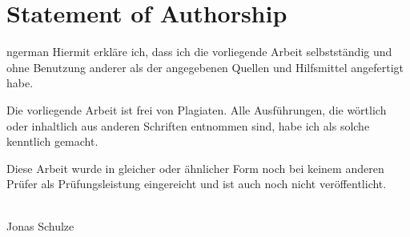 \thispagestyle{empty}
\vspace*{\fill}
\section*{Statement of Authorship}

\begin{foreignlanguage}{ngerman}
Hiermit erkläre ich, dass ich die vorliegende Arbeit selbstständig und ohne
Benutzung anderer als der angegebenen Quellen und Hilfsmittel angefertigt habe.

Die vorliegende Arbeit ist frei von Plagiaten.
Alle Ausführungen, die wörtlich oder inhaltlich aus anderen Schriften entnommen sind,
habe ich als solche kenntlich gemacht.

Diese Arbeit wurde in gleicher oder ähnlicher Form noch bei keinem anderen
Prüfer als Prüfungsleistung eingereicht und ist auch noch nicht veröffentlicht.

\vspace*{3cm}
\noindent
\parbox{5cm}{\centering\footnotesize\dotfill\\Jonas Schulze}
\end{foreignlanguage}
